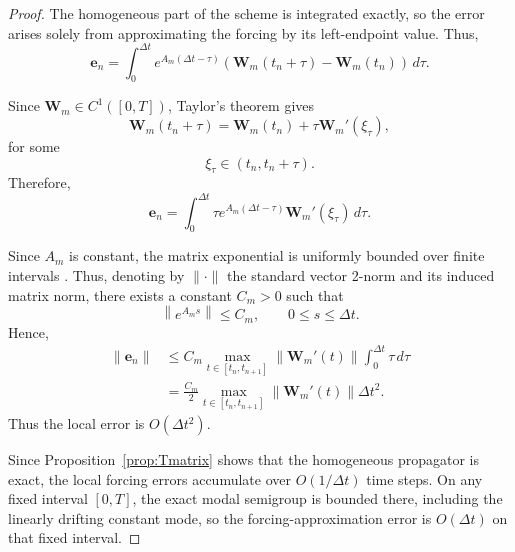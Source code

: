 \documentclass{Configuration_Files/PoliMi3i_thesis}
\begin{document}
\begin{proof}
The homogeneous part of the scheme is integrated exactly, so the error arises
solely from approximating the forcing by its left-endpoint value. Thus,
\begin{equation*}
\mathbf e_n
=
\int_0^{\Delta t}
e^{A_m(\Delta t-\tau)}
\left(
\mathbf W_m(t_n+\tau)
-
\mathbf W_m(t_n)
\right)
\,d\tau.
\end{equation*}

Since $\mathbf W_m\in C^1([0,T])$, Taylor's theorem gives
\begin{equation*}
\mathbf W_m(t_n+\tau)
=
\mathbf W_m(t_n)
+
\tau\mathbf W_m'(\xi_\tau),
\end{equation*}
for some
\begin{equation*}
\xi_\tau\in(t_n,t_n+\tau).
\end{equation*}
Therefore,
\begin{equation*}
\mathbf e_n
=
\int_0^{\Delta t}
\tau
e^{A_m(\Delta t-\tau)}
\mathbf W_m'(\xi_\tau)
\,d\tau.
\end{equation*}

Since $A_m$ is constant, the matrix exponential is uniformly bounded over finite intervals \cite{quarteroni_numerical_2014}. Thus, denoting by $\|\cdot\|$ the standard vector 2-norm and its induced matrix norm, there exists a constant $C_m>0$ such that
\begin{equation*}
\left\|
e^{A_ms}
\right\|
\le
C_m,
\qquad
0\le s\le\Delta t.
\end{equation*}
Hence,
\begin{align*}
\|\mathbf e_n\|
&\le
C_m
\max_{t\in[t_n,t_{n+1}]}
\|\mathbf W_m'(t)\|
\int_0^{\Delta t}\tau\,d\tau\\
&=
\frac{C_m}{2}
\max_{t\in[t_n,t_{n+1}]}
\|\mathbf W_m'(t)\|
\Delta t^2.
\end{align*}
Thus the local error is $O(\Delta t^2)$.

Since Proposition~\ref{prop:Tmatrix} shows that the homogeneous propagator is
exact, the local forcing errors accumulate over $O(1/\Delta t)$ time steps.
On any fixed interval $[0,T]$, the exact modal semigroup is bounded there,
including the linearly drifting constant mode, so the forcing-approximation
error is $O(\Delta t)$ on that fixed interval.
\end{proof}
\end{document}
